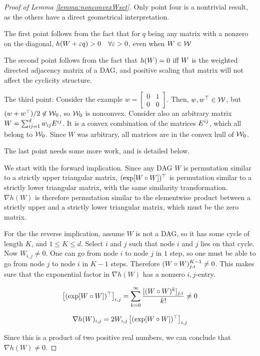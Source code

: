 \begin{proof}[Proof of Lemma \ref{lemma:nonconvexWset}]
Only point four is a nontrivial result, as the others have a direct geometrical interpretation.

The first point follows from the fact that for $q$ being any matrix with a nonzero on the diagonal, $h(W+\varepsilon q) > 0 \quad \forall \varepsilon>0$, even when $W \in \mathcal W$

The second point follows from the fact that $h(W)=0$ iff $W$ is the weighted directed adjacency matrix of a DAG, and positive scaling that matrix will not affect the cyclicity structure.

The third point: Consider the example $w=\begin{bmatrix} 0 &1 \\ 0 & 0 \end{bmatrix}$. Then, $w,w^\top \in \mathcal W$, but $(w+w^\top)/2 \not \in \mathcal W_0$, so $\mathcal W_0$ is nonconvex. Consider also an arbitrary matrix  $W=\sum_{ij=1}^d w_{ij}E^{ij}$. It is a convex combination of the matrices $E^{ij}$, which all belong to $\mathcal W_0$. Since $W$ was arbitrary, all matrices are in the convex hull of $\mathcal W_0$.

The last point needs some more work, and is detailed below.

We start with the forward implication. Since any DAG $W$ is permutation similar to a strictly upper triangular matrix, $(\exp [ W\circ W ])^\top$ is permutation similar to a strictly lower triangular matrix, with the same similarity transformation.
$\nabla h(W)$ is therefore permutation similar to the elementwise product between a strictly upper and a strictly lower triangular matrix, which must be the zero matrix.

For the the reverse implication, assume $W$ is not a DAG, so it has some cycle of length $K$, and $1\leq K \leq d$.
Select $i$ and $j$ such that node $i$ and $j$ lies on that cycle. Now $W_{i,j} \neq 0$.
One can go from node $i$ to node $j$ in $1$ step, so one must be able to go from node $j$ to node $i$ in $K-1$ steps.
Therefore $ (W \circ W)^{K-1}_{j,i} \neq 0$. This makes sure that the exponential factor in $\nabla h(W)$ has a nonzero $i,j$-entry.

\[ \left[ (\exp [ W\circ W ])^\top \right]_{i,j} = \sum_{k=0}^\infty \frac{[(W \circ W)^k]_{j,i}}{k!} \neq 0 \]

\[\nabla h(W)_{i,j} = 2W_{i,j} \left[(\exp [ W\circ W ])^\top \right]_{i,j}\]

Since this is a product of two positive real numbers, we can conclude that $\nabla h(W)  \neq 0$.
\end{proof}

